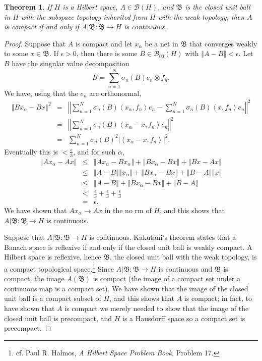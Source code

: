 \documentclass{article}
\newcommand{\inner}[2]{\left\langle #1, #2 \right\rangle}
\newcommand{\norm}[1]{\left\Vert #1 \right\Vert}
\newtheorem{theorem}{Theorem}
\theoremstyle{definition}
\begin{document}
\begin{theorem}
If $H$ is a Hilbert space,
$A \in \mathscr{B}(H)$, and $\mathfrak{B}$ is the closed unit ball in $H$ with the subspace topology inherited from $H$ with the weak topology,
then $A$ is compact if and only if $A|\mathfrak{B}:\mathfrak{B} \to H$ is continuous.
\end{theorem}
\begin{proof}
Suppose that $A$ is compact and let $x_\alpha$ be a net in $\mathfrak{B}$ that converges weakly to some $x \in \mathfrak{B}$. 
If $\epsilon>0$, then there is some $B \in \mathscr{B}_{00}(H)$ with $\norm{A-B}<\epsilon$.
Let $B$ have the singular value decomposition
\[
B=\sum_{n=1}^N \sigma_n(B) e_n \otimes f_n.
\]
We have, using that the $e_n$ are orthonormal,
\begin{eqnarray*}
\norm{Bx_\alpha - Bx}^2&=&\norm{ \sum_{n=1}^N \sigma_n(B) \inner{x_\alpha}{f_n}e_n - \sum_{n=1}^N \sigma_n(B) \inner{x}{f_n}e_n}^2\\
&=&\norm{ \sum_{n=1}^N \sigma_n(B) \inner{x_\alpha - x}{f_n}e_n}^2\\
&=&\sum_{n=1}^N  \sigma_n(B)^2 |\inner{x_\alpha-x}{f_n}|^2.
\end{eqnarray*}
Eventually this is $<\frac{\epsilon}{3}$, and for such $\alpha$,
\begin{eqnarray*}
\norm{Ax_\alpha-Ax}&\leq&\norm{Ax_\alpha-Bx_\alpha}+\norm{Bx_\alpha-Bx}+\norm{Bx-Ax}\\
&\leq&\norm{A-B}\norm{x_\alpha}+\norm{Bx_\alpha-Bx}+\norm{B-A}\norm{x}\\
&\leq&\norm{A-B}+\norm{Bx_\alpha-Bx}+\norm{B-A}\\
&<&\frac{\epsilon}{3}+\frac{\epsilon}{3}+\frac{\epsilon}{3}\\
&=&\epsilon.
\end{eqnarray*}
We have shown that $Ax_\alpha \to Ax$ in the no rm of $H$, and this shows that $A|\mathfrak{B}:\mathfrak{B} \to H$ is continuous.

Suppose that $A|\mathfrak{B}:\mathfrak{B} \to H$ is continuous. Kakutani's theorem states that a Banach space is reflexive if and only if the closed unit ball is weakly
compact. A Hilbert space is reflexive, hence $\mathfrak{B}$, the closed unit ball with the weak topology, is a compact topological
space.\footnote{cf. Paul R. Halmos, {\em A Hilbert Space Problem Book}, Problem 17.} 
Since $A|\mathfrak{B}:\mathfrak{B} \to H$
is continuous and $\mathfrak{B}$ is compact, the image $A(\mathfrak{B})$ is compact (the image of a compact set under a continuous map is a compact set). We have shown that the image of the closed unit ball is a compact subset of $H$, and this
shows that $A$ is compact; in fact, to have shown that $A$ is compact we merely needed to show that the image of the closed unit ball is precompact, and $H$ is a Hausdorff
space so a compact set is precompact.
\end{proof}
\end{document}
